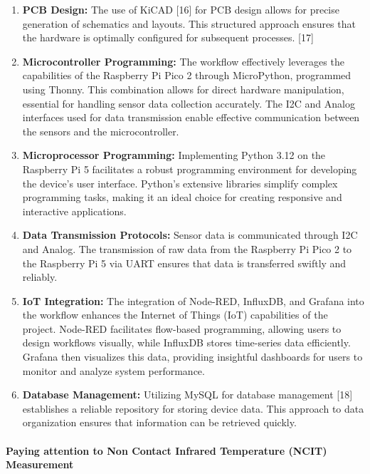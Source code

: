 \documentclass{article}
\begin{document}
\begin{enumerate}
\def\labelenumi{\arabic{enumi}.}
\item
  \textbf{PCB Design:} The use of KiCAD {[}16{]} for PCB design allows
  for precise generation of schematics and layouts. This structured
  approach ensures that the hardware is optimally configured for
  subsequent processes. {[}17{]}
\item
  \textbf{Microcontroller Programming:} The workflow effectively
  leverages the capabilities of the Raspberry Pi Pico 2 through
  MicroPython, programmed using Thonny. This combination allows for
  direct hardware manipulation, essential for handling sensor data
  collection accurately. The I2C and Analog interfaces used for data
  transmission enable effective communication between the sensors and
  the microcontroller.
\item
  \textbf{Microprocessor Programming:} Implementing Python 3.12 on the
  Raspberry Pi 5 facilitates a robust programming environment for
  developing the device's user interface. Python's extensive libraries
  simplify complex programming tasks, making it an ideal choice for
  creating responsive and interactive applications.
\item
  \textbf{Data Transmission Protocols:} Sensor data is communicated
  through I2C and Analog. The transmission of raw data from the
  Raspberry Pi Pico 2 to the Raspberry Pi 5 via UART ensures that data
  is transferred swiftly and reliably.
\item
  \textbf{IoT Integration:} The integration of Node-RED, InfluxDB, and
  Grafana into the workflow enhances the Internet of Things (IoT)
  capabilities of the project. Node-RED facilitates flow-based
  programming, allowing users to design workflows visually, while
  InfluxDB stores time-series data efficiently. Grafana then visualizes
  this data, providing insightful dashboards for users to monitor and
  analyze system performance.
\item
  \textbf{Database Management:} Utilizing MySQL for database management
  {[}18{]} establishes a reliable repository for storing device data.
  This approach to data organization ensures that information can be
  retrieved quickly.
\end{enumerate}

\paragraph{Paying attention to Non Contact Infrared Temperature (NCIT)
Measurement}\label{paying-attention-to-non-contact-infrared-temperature-ncit-measurement}
\end{document}
